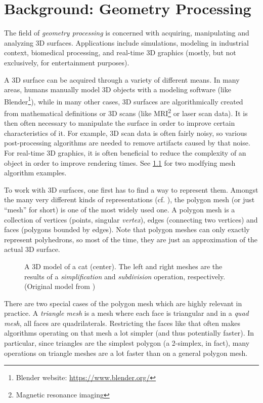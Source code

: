 \newlength{\origtabcolsep}
\setlength{\origtabcolsep}{\tabcolsep}


\chapter{Background: Geometry Processing}

The field of \emph{geometry processing} is concerned with acquiring, manipulating and analyzing 3D surfaces.
Applications include simulations, modeling in industrial context, biomedical processing, and real-time 3D graphics (mostly, but not exclusively, for entertainment purposes).

A 3D surface can be acquired through a variety of different means.
In many areas, humans manually model 3D objects with a modeling software (like Blender\footnote{Blender website: \url{https://www.blender.org/}}), while in many other cases, 3D surfaces are algorithmically created from mathematical definitions or 3D scans (like MRI\footnote{Magnetic resonance imaging} or laser scan data).
It is then often necessary to manipulate the surface in order to improve certain characteristics of it.
For example, 3D scan data is often fairly noisy, so various post-processing algorithms are needed to remove artifacts caused by that noise.
For real-time 3D graphics, it is often beneficial to reduce the complexity of an object in order to improve rendering times.
See \ref{fig:cat-algo} for two modfying mesh algorithm examples.

To work with 3D surfaces, one first has to find a way to represent them.
Amongst the many very different kinds of representations (cf. \cite[Chapter~1]{botsch2010polygon}), the polygon mesh (or just \enquote{mesh} for short) is one of the most widely used one.
A polygon mesh is a collection of vertices (points, singular \emph{vertex}), edges (connecting two vertices) and faces (polygons bounded by edges).
Note that polygon meshes can only exactly represent polyhedrons, so most of the time, they are just an approximation of the actual 3D surface.

\begin{figure}[b]
  
  \caption{A 3D model of a cat (center).
  The left and right meshes are the results of a \emph{simplification} and \emph{subdivision} operation, respectively.
  (Original model from \cite{catmodel})}
  \label{fig:cat-algo}
\end{figure}

There are two special cases of the polygon mesh which are highly relevant in practice.
A \emph{triangle mesh} is a mesh where each face is triangular and in a \emph{quad mesh}, all faces are quadrilaterals.
Restricting the faces like that often makes algorithms operating on that mesh a lot simpler (and thus potentially faster).
In particular, since triangles are the simplest polygon (a 2-simplex, in fact), many operations on triangle meshes are a lot faster than on a general polygon mesh.

